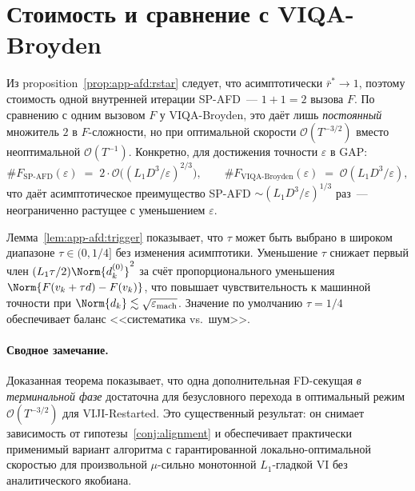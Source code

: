 \section{Стоимость и сравнение с VIQA-Broyden}
\label{sec:app-afd:cost}

Из proposition~\ref{prop:app-afd:rstar} следует, что асимптотически
$\bar r^{*} \to 1$, поэтому стоимость одной внутренней итерации
SP-AFD~--- $1 + 1 = 2$ вызова $F$. По сравнению с одним вызовом
$F$ у VIQA-Broyden, это даёт лишь \emph{постоянный} множитель $2$ в
$F$-сложности, но при оптимальной скорости $\mathcal O(T^{-3/2})$
вместо неоптимальной $\mathcal O(T^{-1})$. Конкретно, для достижения
точности $\varepsilon$ в GAP:
\[
\#F_{\mathrm{SP\text{-}AFD}}(\varepsilon)
\;=\;
2\cdot \mathcal O\bigl((L_1 D^{3}/\varepsilon)^{2/3}\bigr),
\qquad
\#F_{\mathrm{VIQA\text{-}Broyden}}(\varepsilon)
\;=\;
\mathcal O(L_1 D^{3}/\varepsilon),
\]
что даёт асимптотическое преимущество SP-AFD $\sim (L_1 D^{3}/\varepsilon)^{1/3}$
раз~--- неограниченно растущее с уменьшением $\varepsilon$.

\begin{remark}
\label{rem:app-afd:tau-sens}
Лемма~\ref{lem:app-afd:trigger} показывает, что $\tau$ может быть
выбрано в широком диапазоне $\tau \in (0, 1/4]$ без изменения
асимптотики. Уменьшение $\tau$ снижает первый член
$(L_1\tau/2)\Norm{d^{(0)}_k}^{2}$ за счёт пропорционального уменьшения
$\Norm{F(v_k + \tau d) - F(v_k)}$, что повышает чувствительность к
машинной точности при $\Norm{d_k} \lesssim \sqrt{\varepsilon_{\mathrm{mach}}}$.
Значение по умолчанию $\tau = 1/4$ обеспечивает баланс <<систематика vs.\ шум>>.
\end{remark}

\paragraph{Сводное замечание.}
Доказанная теорема показывает, что одна дополнительная FD-секущая
\emph{в терминальной фазе} достаточна для безусловного перехода в
оптимальный режим $\mathcal O(T^{-3/2})$ для VIJI-Restarted. Это
существенный результат: он снимает зависимость от
гипотезы~\ref{conj:alignment} и обеспечивает практически применимый
вариант алгоритма с гарантированной локально-оптимальной скоростью
для произвольной $\mu$-сильно монотонной $L_1$-гладкой VI без
аналитического якобиана.
